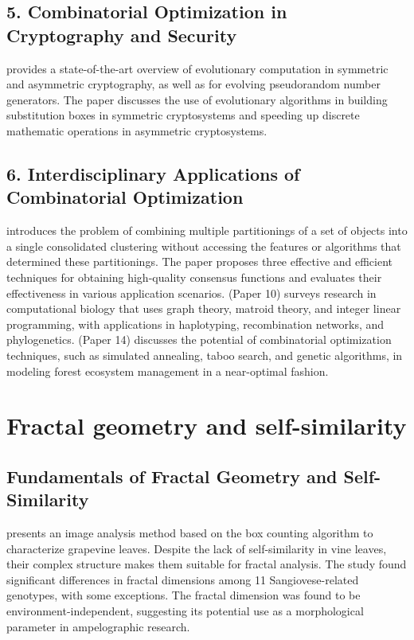 \documentclass{article}
\begin{document}
\subsection{5. Combinatorial Optimization in Cryptography and Security}

\cite{Knezevic2017CombinatorialOI} provides a state-of-the-art overview of evolutionary computation in symmetric and asymmetric cryptography, as well as for evolving pseudorandom number generators. The paper discusses the use of evolutionary algorithms in building substitution boxes in symmetric cryptosystems and speeding up discrete mathematic operations in asymmetric cryptosystems.

\subsection{6. Interdisciplinary Applications of Combinatorial Optimization}

\cite{Strehl2003ClusterE} introduces the problem of combining multiple partitionings of a set of objects into a single consolidated clustering without accessing the features or algorithms that determined these partitionings. The paper proposes three effective and efficient techniques for obtaining high-quality consensus functions and evaluates their effectiveness in various application scenarios. (Paper 10) surveys research in computational biology that uses graph theory, matroid theory, and integer linear programming, with applications in haplotyping, recombination networks, and phylogenetics. (Paper 14) discusses the potential of combinatorial optimization techniques, such as simulated annealing, taboo search, and genetic algorithms, in modeling forest ecosystem management in a near-optimal fashion.


\section{Fractal geometry and self-similarity}

\subsection{Fundamentals of Fractal Geometry and Self-Similarity}

\cite{Mancuso2015FractalGI} presents an image analysis method based on the box counting algorithm to characterize grapevine leaves. Despite the lack of self-similarity in vine leaves, their complex structure makes them suitable for fractal analysis. The study found significant differences in fractal dimensions among 11 Sangiovese-related genotypes, with some exceptions. The fractal dimension was found to be environment-independent, suggesting its potential use as a morphological parameter in ampelographic research.
\end{document}
